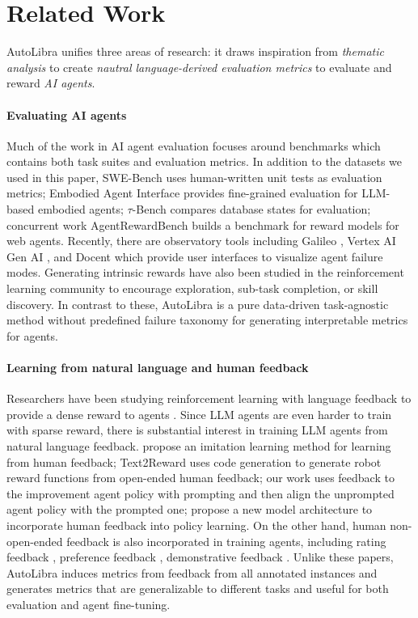 \section{Related Work}
AutoLibra unifies three areas of research: it draws inspiration from \textit{thematic analysis} to create \textit{nautral language-derived evaluation metrics} to evaluate and reward \textit{AI agents}. 

\paragraph{Evaluating AI agents} Much of the work in AI agent evaluation focuses around benchmarks which contains both task suites and evaluation metrics. In addition to the datasets we used in this paper, SWE-Bench \citep{jimenezswe} uses human-written unit tests as evaluation metrics; Embodied Agent Interface \citep{li2024embodied} provides fine-grained evaluation for LLM-based embodied agents; $\tau$-Bench \citep{yao2024tau} compares database states for evaluation; concurrent work AgentRewardBench \citep{lù2025agentrewardbenchevaluatingautomaticevaluations} builds a benchmark for reward models for web agents. Recently, there are observatory tools including Galileo \citep{galileo_agentic}, Vertex AI Gen AI \citep{google_agent_eval}, and Docent \citep{meng2025docent} which provide user interfaces to visualize agent failure modes. Generating intrinsic rewards have also been studied in the reinforcement learning community \citep{du2019liir,pathakICMl17curiosity,laskin2022cic} to encourage exploration, sub-task completion, or skill discovery. In contrast to these, AutoLibra is a pure data-driven task-agnostic method without predefined failure taxonomy for generating interpretable metrics for agents. 

\paragraph{Learning from natural language and human feedback} Researchers have been studying reinforcement learning with language feedback to provide a dense reward to agents \citep{goyal2019using}. Since LLM agents are even harder to train with sparse reward, there is substantial interest in training LLM agents from natural language feedback. \citet{chen2024learning} propose an imitation learning method for learning from human feedback; Text2Reward \citep{xietext2reward} uses code generation to generate robot reward functions from open-ended human feedback; our work \citep{chen2025fine} uses feedback to the improvement agent policy with prompting and then align the unprompted agent policy with the prompted one; \citet{shi2024yell} propose a new model architecture to incorporate human feedback into policy learning. On the other hand, human non-open-ended feedback is also incorporated in training agents, including rating feedback \citep{nguyen2017reinforcement}, preference feedback \citep{christiano2017deep}, demonstrative feedback \citep{shaikhaligning}.
Unlike these papers, AutoLibra induces metrics from feedback from all annotated instances and generates metrics that are generalizable to different tasks and useful for both evaluation and agent fine-tuning.

